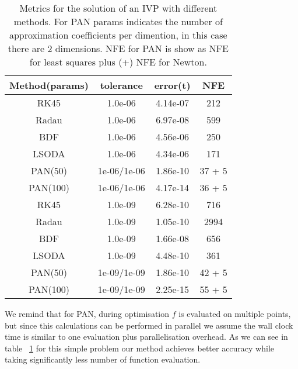 \documentclass[11pt]{article}
\begin{document}
    \renewcommand{\arraystretch}{1.5}
    \renewcommand{\tabcolsep}{10.25pt}
    \begin{table}[!h]
        \begin{center}
            \caption{Metrics for the solution of an IVP with different methods. For PAN params indicates the number of
            approximation coefficients per dimention, in this case there are 2 dimensions.
            NFE for PAN is show as NFE for least squares plus (+) NFE for Newton.}
            \label{spiral-metrics}
            \begin{tabular}{|c|c|c|c|}
                \hline
                Method(params) & tolerance & error(t) & NFE \\
                \hline
                RK45 & 1.0e-06 & 4.14e-07 & 212
                \\ \hline
                Radau & 1.0e-06 & 6.97e-08 & 599
                \\ \hline
                BDF & 1.0e-06 & 4.56e-06 & 250
                \\ \hline
                LSODA & 1.0e-06 & 4.34e-06 & 171
                \\ \hline
                PAN(50) & 1e-06/1e-06 & 1.86e-10 & 37 + 5
                \\ \hline
                PAN(100) & 1e-06/1e-06 & 4.17e-14 & 36 + 5
                \\ \hline \hline
                RK45 & 1.0e-09 & 6.28e-10 & 716
                \\ \hline
                Radau & 1.0e-09 & 1.05e-10 & 2994
                \\ \hline
                BDF & 1.0e-09 & 1.66e-08 & 656
                \\ \hline
                LSODA & 1.0e-09 & 4.48e-10 & 361
                \\ \hline
                PAN(50) & 1e-09/1e-09 & 1.86e-10 & 42 + 5
                \\ \hline
                PAN(100) & 1e-09/1e-09 & 2.25e-15 & 55 + 5
                \\ \hline
            \end{tabular}
        \end{center}
    \end{table}

    We remind that for PAN, during optimisation $f$ is evaluated on multiple points, but since this calculations can be
    performed in parallel we assume the wall clock time is similar to one evaluation plus parallelisation overhead.
    As we can see in table ~\ref{spiral-metrics} for this simple problem our method achieves better accuracy while
    taking significantly less number of function evaluation.
\end{document}
